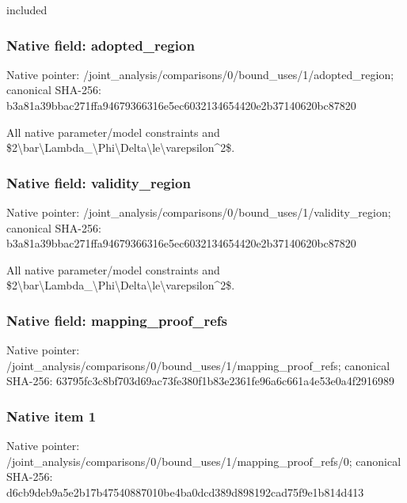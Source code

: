 \documentclass[10pt,a4paper]{article}
\begin{document}
included


\subsubsection{Native field: adopted\_region}


Native pointer: /joint\_analysis/comparis\allowbreak{}ons/0/bound\_uses/1/adopt\allowbreak{}ed\_region; canonical SHA-256: b3a81a39bbac271ffa946793\allowbreak{}66316e5ec6032134654420e2\allowbreak{}b37140620bc87820


All native parameter/model constraints and \$2\textbackslash{}bar\textbackslash{}Lambda\_\textbackslash{}Phi\textbackslash{}Delta\allowbreak{}\textbackslash{}le\textbackslash{}varepsilon\textasciicircum{}2\$.


\subsubsection{Native field: validity\_region}


Native pointer: /joint\_analysis/comparis\allowbreak{}ons/0/bound\_uses/1/valid\allowbreak{}ity\_region; canonical SHA-256: b3a81a39bbac271ffa946793\allowbreak{}66316e5ec6032134654420e2\allowbreak{}b37140620bc87820


All native parameter/model constraints and \$2\textbackslash{}bar\textbackslash{}Lambda\_\textbackslash{}Phi\textbackslash{}Delta\allowbreak{}\textbackslash{}le\textbackslash{}varepsilon\textasciicircum{}2\$.


\subsubsection{Native field: mapping\_proof\_refs}


Native pointer: /joint\_analysis/comparis\allowbreak{}ons/0/bound\_uses/1/mappi\allowbreak{}ng\_proof\_refs; canonical SHA-256: 63795fc3c8bf703d69ac73fe\allowbreak{}380f1b83e2361fe96a6c661a\allowbreak{}4e53e0a4f2916989



\subsubsection{Native item 1}


Native pointer: /joint\_analysis/comparis\allowbreak{}ons/0/bound\_uses/1/mappi\allowbreak{}ng\_proof\_refs/0; canonical SHA-256: d6cb9deb9a5e2b17b4754088\allowbreak{}7010be4ba0dcd389d898192c\allowbreak{}ad75f9e1b814d413
\end{document}
